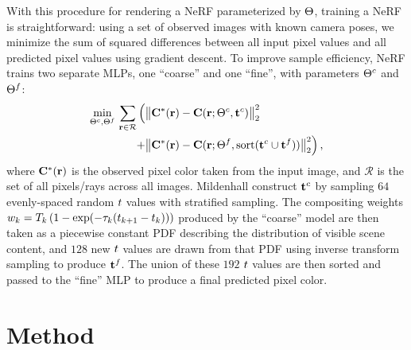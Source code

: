 \documentclass[10pt,twocolumn,letterpaper]{article}
\begin{document}
With this procedure for rendering a NeRF parameterized by $\Theta$, training a NeRF is straightforward: using a set of observed images with known camera poses, we minimize the sum of squared differences between all input pixel values and all predicted pixel values using gradient descent. To improve sample efficiency, NeRF trains two separate MLPs, one ``coarse'' and one ``fine'', with parameters $\Theta^c$ and $\Theta^f$:
\begin{align}
    \underset{\Theta^c, \Theta^f}{\operatorname{min}}\, \sum_{\mathbf{r} \in \mathcal{R}} \Big( & \big\| \mathbf{C}^*(\mathbf{r}) - \mathbf{C}(\mathbf{r}; \Theta^c, \mathbf{t}^{c}) \big\|_2^2 \label{eq:nerfopt} \\
    + & \big\| \mathbf{C}^*(\mathbf{r}) - \mathbf{C}(\mathbf{r}; \Theta^f, \operatorname{sort}(\mathbf{t}^{c} \cup \mathbf{t}^{f})) \big\|_2^2 \Big)\,, \nonumber
\end{align}
where $\mathbf{C}^*(\mathbf{r})$ is the observed pixel color taken from the input image, and $\mathcal{R}$ is the set of all pixels/rays across all images. Mildenhall \etal construct $\mathbf{t}^{c}$ by sampling $64$ evenly-spaced random $t$ values with stratified sampling. The compositing weights $w_k = T_k \, \left(1-\exp(-\density_k (t_{k+1} - t_k)) \right)$ produced by the ``coarse'' model are then taken as a piecewise constant PDF describing the distribution of visible scene content, and $128$ new $t$ values are drawn from that PDF using inverse transform sampling to produce $\mathbf{t}^{f}$. The union of these $192$ $t$ values are then sorted and passed to the ``fine'' MLP to produce a final predicted pixel color.

\section{Method}

\end{document}

